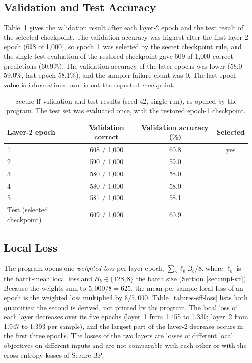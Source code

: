 \FloatBarrier
\subsection{Validation and Test Accuracy}\label{sec:res-sff-utility}
Table~\ref{tab:res-sff-val} gives the validation result after each layer-2 epoch and the test result of the selected checkpoint. The validation accuracy was highest after the first layer-2 epoch (608 of 1{,}000), so epoch~1 was selected by the secret checkpoint rule, and the single test evaluation of the restored checkpoint gave 609 of 1{,}000 correct predictions (60.9\%). The validation accuracy of the later epochs was lower (58.0--59.0\%, last epoch 58.1\%), and the sampler failure count was 0. The last-epoch value is informational and is not the reported checkpoint.

\begin{table}[htbp]
\centering
\small
\begin{tabular}{@{}lccc@{}}
\toprule
Layer-2 epoch & Validation correct & Validation accuracy (\%) & Selected \\
\midrule
1 & 608 / 1{,}000 & 60.8 & yes \\
2 & 590 / 1{,}000 & 59.0 & \\
3 & 580 / 1{,}000 & 58.0 & \\
4 & 580 / 1{,}000 & 58.0 & \\
5 & 581 / 1{,}000 & 58.1 & \\
\midrule
Test (selected checkpoint) & 609 / 1{,}000 & 60.9 & \\
\bottomrule
\end{tabular}
\caption{Secure \ac{ff} validation and test results (seed 42, single run), as opened by the program. The test set was evaluated once, with the restored epoch-1 checkpoint.}
\label{tab:res-sff-val}
\end{table}

\FloatBarrier
\subsection{Local Loss}\label{sec:res-sff-loss}
The program opens one \emph{weighted loss} per layer-epoch, $\sum_b \ell_b B_b/8$, where $\ell_b$ is the batch-mean local loss and $B_b\in\{128,8\}$ the batch size (Section~\ref{sec:impl-sff}). Because the weights sum to $5{,}000/8=625$, the mean per-sample local loss of an epoch is the weighted loss multiplied by $8/5{,}000$. Table~\ref{tab:res-sff-loss} lists both quantities; the second is derived, not printed by the program. The local loss of each layer decreases over its five epochs (layer~1 from 1.455 to 1.330; layer~2 from 1.947 to 1.393 per sample), and the largest part of the layer-2 decrease occurs in the first three epochs. The losses of the two layers are losses of different local objectives on different inputs and are not comparable with each other or with the cross-entropy losses of Secure BP.


